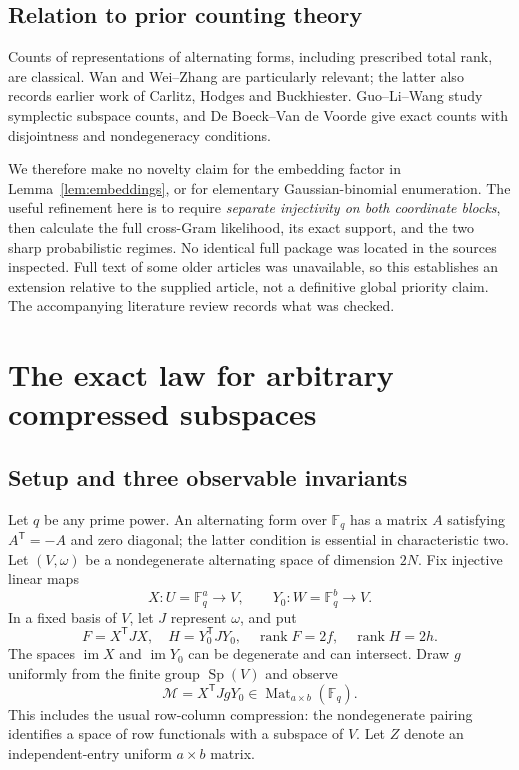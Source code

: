 \documentclass[11pt]{article}
\numberwithin{equation}{section}
\theoremstyle{definition}
\theoremstyle{remark}
\newcommand{\F}{\mathbb F}
\newcommand{\Mat}{\operatorname{Mat}}
\newcommand{\Sp}{\operatorname{Sp}}
\newcommand{\rank}{\operatorname{rank}}
\newcommand{\im}{\operatorname{im}}
\newcommand{\tr}{\mathsf T}
\begin{document}
\subsection{Relation to prior counting theory}
Counts of representations of alternating forms, including prescribed total rank, are classical. Wan \cite{wan} and Wei--Zhang \cite{weizhang} are particularly relevant; the latter also records earlier work of Carlitz, Hodges and Buckhiester. Guo--Li--Wang \cite{guo} study symplectic subspace counts, and De Boeck--Van de Voorde \cite{deboeck} give exact counts with disjointness and nondegeneracy conditions.

We therefore make no novelty claim for the embedding factor in Lemma~\ref{lem:embeddings}, or for elementary Gaussian-binomial enumeration. The useful refinement here is to require \emph{separate injectivity on both coordinate blocks}, then calculate the full cross-Gram likelihood, its exact support, and the two sharp probabilistic regimes. No identical full package was located in the sources inspected. Full text of some older articles was unavailable, so this establishes an extension relative to the supplied article, not a definitive global priority claim. The accompanying literature review records what was checked.

\section{The exact law for arbitrary compressed subspaces}
\label{sec:law}

\subsection{Setup and three observable invariants}
Let $q$ be any prime power. An alternating form over $\F_q$ has a matrix $A$ satisfying $A^\tr=-A$ and zero diagonal; the latter condition is essential in characteristic two. Let $(V,\omega)$ be a nondegenerate alternating space of dimension $2N$. Fix injective linear maps
\[
 X:U=\F_q^a\longrightarrow V,
 \qquad Y_0:W=\F_q^b\longrightarrow V.
\]
In a fixed basis of $V$, let $J$ represent $\omega$, and put
\[
 F=X^\tr JX,\quad H=Y_0^\tr JY_0,\quad
 \rank F=2f,\quad \rank H=2h.
\]
The spaces $\im X$ and $\im Y_0$ can be degenerate and can intersect. Draw $g$ uniformly from the finite group $\Sp(V)$ and observe
\begin{equation}\label{eq:observation}
 \mathcal M=X^\tr JgY_0\in\Mat_{a\times b}(\F_q).
\end{equation}
This includes the usual row-column compression: the nondegenerate pairing identifies a space of row functionals with a subspace of $V$. Let $Z$ denote an independent-entry uniform $a\times b$ matrix.
\end{document}
